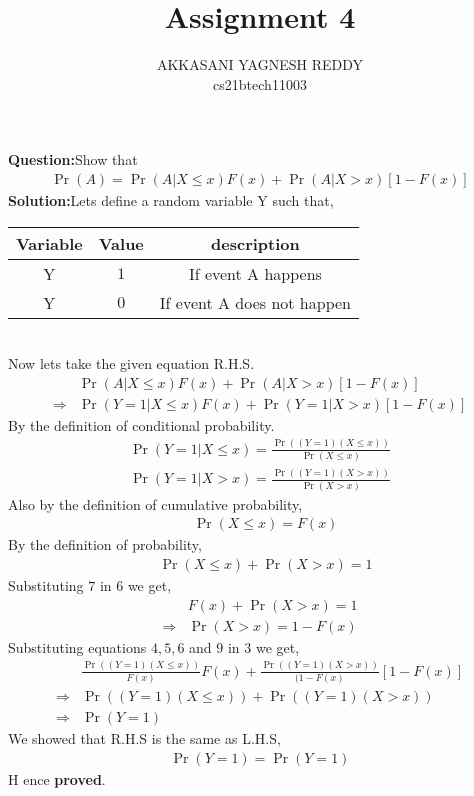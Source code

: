 \documentclass[journal,12pt,twocolumn]{IEEEtran}
\title{Assignment 4}
\author{AKKASANI YAGNESH REDDY \\
     cs21btech11003 \\}
\providecommand{\pr}[1]{\ensuremath{\Pr\left(#1\right)}}
\begin{document}
     \maketitle
     \textbf{Question:}Show that
     \begin{align}
         \pr{A}=\pr{A|X\leq x}F(x)+\pr{A|X>x}[1-F(x)]
         \end{align}
\textbf{Solution:}Lets define a random variable Y such that,
\begin{table}[h!]
    \begin{tabular}{|c|c|c|} \hline
    \textbf{Variable} & \textbf{Value} & \textbf{description} \\ \hline
    Y  & $1$ & If event A happens \\ \hline
    Y  & $0$ & If event A does not happen \\ \hline
    \end{tabular}
    \end{table}\\
Now lets take the given equation R.H.S.
\begin{align}
         &\pr{A|X\leq x}F(x)+\pr{A|X>x}[1-F(x)]\\
         \Rightarrow &\pr{Y=1|X\leq x}F(x)+\pr{Y=1|X>x}[1-F(x)]
 \end{align}
By the definition of conditional probability.\\
\begin{align}
    \pr{Y=1|X\leq x}=\frac{\pr{(Y=1)(X\leq x)}}{\pr{X\leq x}} \\
    \pr{Y=1|X>x}=\frac{\pr{(Y=1)(X>x)}}{\pr{X>x}}
\end{align}
Also by the definition of cumulative probability,
\begin{align}
    &\pr{X \leq x}=F(x) 
    \end{align}
By the definition of probability,    
    \begin{align}
    &\pr{X \leq x}+\pr{X>x}=1 
    \end{align}
   Substituting $7$ in $6$ we get,
\begin{align}
    &F(x)+\pr{X>x}=1 \\
    \Rightarrow &\pr{X>x}=1-F(x) 
\end{align}
Substituting equations $4,5,6$ and $9$ in 3 we get,
\begin{align}
&\frac{\pr{(Y=1)(X\leq x)}}{F(x)}F(x)+ \frac{\pr{(Y=1)(X>x)}}{(1-F(x)}[1-F(x)] \\
\Rightarrow &\pr{(Y=1)(X\leq x)} + \pr{(Y=1)(X>x)}\\
\Rightarrow&\pr{Y=1}
\end{align}
\newpage
We showed that R.H.S is the same as L.H.S,
\begin{align}
    \pr{Y=1}=\pr{Y=1}
\end{align}
       \centering
       H
       ence \textbf{proved}.
\end{document}
